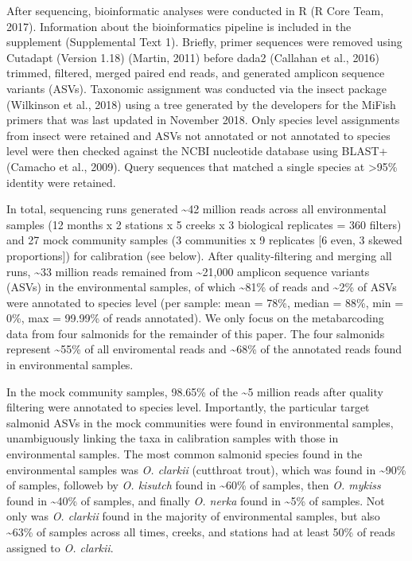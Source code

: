 \documentclass[
]{article}
\begin{document}
After sequencing, bioinformatic analyses were conducted in R (R Core
Team, 2017). Information about the bioinformatics pipeline is included
in the supplement (Supplemental Text 1). Briefly, primer sequences were
removed using Cutadapt (Version 1.18) (Martin, 2011) before dada2
(Callahan et al., 2016) trimmed, filtered, merged paired end reads, and
generated amplicon sequence variants (ASVs). Taxonomic assignment was
conducted via the insect package (Wilkinson et al., 2018) using a tree
generated by the developers for the MiFish primers that was last updated
in November 2018. Only species level assignments from insect were
retained and ASVs not annotated or not annotated to species level were
then checked against the NCBI nucleotide database using BLAST+ (Camacho
et al., 2009). Query sequences that matched a single species at
\textgreater95\% identity were retained.

In total, sequencing runs generated \textasciitilde42 million reads
across all environmental samples (12 months x 2 stations x 5 creeks x 3
biological replicates = 360 filters) and 27 mock community samples (3
communities x 9 replicates {[}6 even, 3 skewed proportions{]}) for
calibration (see below). After quality-filtering and merging all runs,
\textasciitilde33 million reads remained from \textasciitilde21,000
amplicon sequence variants (ASVs) in the environmental samples, of which
\textasciitilde81\% of reads and \textasciitilde2\% of ASVs were
annotated to species level (per sample: mean = 78\%, median = 88\%, min
= 0\%, max = 99.99\% of reads annotated). We only focus on the
metabarcoding data from four salmonids for the remainder of this paper.
The four salmonids represent \textasciitilde55\% of all enviromental
reads and \textasciitilde68\% of the annotated reads found in
environmental samples.

In the mock community samples, 98.65\% of the \textasciitilde5 million
reads after quality filtering were annotated to species level.
Importantly, the particular target salmonid ASVs in the mock communities
were found in environmental samples, unambiguously linking the taxa in
calibration samples with those in environmental samples. The most common
salmonid species found in the environmental samples was \emph{O.
clarkii} (cutthroat trout), which was found in \textasciitilde90\% of
samples, followeb by \emph{O. kisutch} found in \textasciitilde60\% of
samples, then \emph{O. mykiss} found in \textasciitilde40\% of samples,
and finally \emph{O. nerka} found in \textasciitilde5\% of samples. Not
only was \emph{O. clarkii} found in the majority of environmental
samples, but also \textasciitilde63\% of samples across all times,
creeks, and stations had at least 50\% of reads assigned to \emph{O.
clarkii}.
\end{document}

